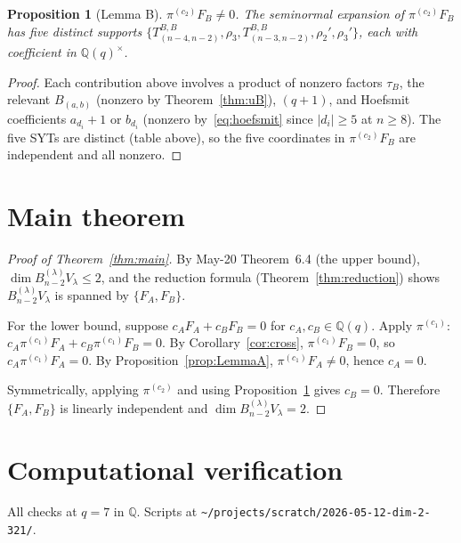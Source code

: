 \documentclass[11pt]{article}
\newtheorem{proposition}[theorem]{Proposition}
\theoremstyle{definition}
\begin{document}
\begin{proposition}[Lemma B]\label{prop:LemmaB}
$\pi^{(c_2)} F_B \ne 0$. The seminormal expansion of
$\pi^{(c_2)} F_B$ has five distinct supports
$\{T^{B,B}_{(n-4, n-2)}, \rho_3, T^{B,B}_{(n-3, n-2)}, \rho_2',
\rho_3'\}$, each with coefficient in $\mathbb{Q}(q)^\times$.
\end{proposition}

\begin{proof}
Each contribution above involves a product of nonzero factors
$\tau_B$, the relevant $B_{(a, b)}$ (nonzero by Theorem~\ref{thm:uB}),
$(q+1)$, and Hoefsmit coefficients $a_{d_i}{+}1$ or $b_{d_i}$
(nonzero by~\eqref{eq:hoefsmit} since $|d_i| \ge 5$ at $n \ge 8$).
The five SYTs are distinct (table above), so the five coordinates
in $\pi^{(c_2)} F_B$ are independent and all nonzero.
\end{proof}

\section{Main theorem}\label{sec:main}

\begin{proof}[Proof of Theorem~\ref{thm:main}]
By May-20 Theorem~6.4 (the upper bound),
$\dim B_{n-2}^{(\lambda)} V_\lambda \le 2$, and the reduction
formula (Theorem~\ref{thm:reduction}) shows
$B_{n-2}^{(\lambda)} V_\lambda$ is spanned by $\{F_A, F_B\}$.

For the lower bound, suppose $c_A F_A + c_B F_B = 0$ for
$c_A, c_B \in \mathbb{Q}(q)$. Apply $\pi^{(c_1)}$:
$c_A \pi^{(c_1)} F_A + c_B \pi^{(c_1)} F_B = 0$.
By Corollary~\ref{cor:cross}, $\pi^{(c_1)} F_B = 0$, so
$c_A \pi^{(c_1)} F_A = 0$. By Proposition~\ref{prop:LemmaA},
$\pi^{(c_1)} F_A \ne 0$, hence $c_A = 0$.

Symmetrically, applying $\pi^{(c_2)}$ and using
Proposition~\ref{prop:LemmaB} gives $c_B = 0$. Therefore
$\{F_A, F_B\}$ is linearly independent and
$\dim B_{n-2}^{(\lambda)} V_\lambda = 2$.
\end{proof}

\section{Computational verification}\label{sec:verify}

All checks at $q = 7$ in $\mathbb{Q}$. Scripts at
\texttt{\textasciitilde/projects/scratch/2026-05-12-dim-2-321/}.
\end{document}
